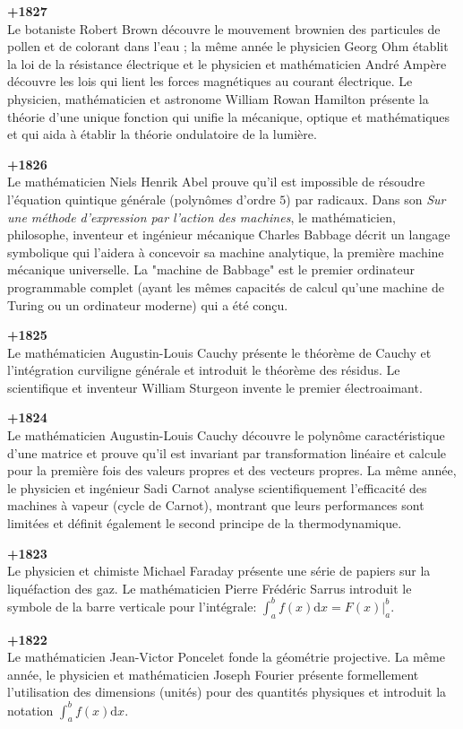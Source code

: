 \textbf{+1827}\\
Le botaniste Robert Brown découvre le mouvement brownien des particules de pollen et de colorant dans l'eau ; la même année le physicien Georg Ohm établit la loi de la résistance électrique et le physicien et mathématicien André Ampère découvre les lois qui lient les forces magnétiques au courant électrique. Le physicien, mathématicien et astronome William Rowan Hamilton présente la théorie d'une unique fonction qui unifie la mécanique, optique et mathématiques et qui aida à établir la théorie ondulatoire de la lumière.

\textbf{+1826}\\
Le mathématicien Niels Henrik Abel prouve qu'il est impossible de résoudre l'équation quintique générale (polynômes d'ordre $5$) par radicaux. Dans son \textit{Sur une méthode d'expression par l'action des machines}, le mathématicien, philosophe, inventeur et ingénieur mécanique Charles Babbage décrit un langage symbolique qui l'aidera à concevoir sa machine analytique, la première machine mécanique universelle. La "machine de Babbage" est le premier ordinateur programmable complet (ayant les mêmes capacités de calcul qu'une machine de Turing ou un ordinateur moderne) qui a été conçu.

\textbf{+1825}\\
Le mathématicien Augustin-Louis Cauchy présente le théorème de Cauchy et l'intégration curviligne générale et introduit le théorème des résidus. Le scientifique et inventeur William Sturgeon invente le premier électroaimant.

\textbf{+1824}\\
Le mathématicien Augustin-Louis Cauchy découvre le polynôme caractéristique d'une matrice et prouve qu'il est invariant par transformation linéaire et calcule pour la première fois des valeurs propres et des vecteurs propres. La même année, le physicien et ingénieur Sadi Carnot analyse scientifiquement l'efficacité des machines à vapeur (cycle de Carnot), montrant que leurs performances sont limitées et définit également le second principe de la thermodynamique.

\textbf{+1823}\\
Le physicien et chimiste Michael Faraday présente une série de papiers sur la liquéfaction des gaz.  Le mathématicien Pierre Frédéric Sarrus introduit le symbole de la barre verticale pour l'intégrale: $\int_a^b f(x)\mathrm{d}x= F(x)|_a^b$.

\textbf{+1822}\\
Le mathématicien Jean-Victor Poncelet fonde la géométrie projective. La même année, le physicien et mathématicien Joseph Fourier présente formellement l'utilisation des dimensions (unités) pour des quantités physiques et introduit la notation $\int_a^bf(x)\mathrm{d}x$.

